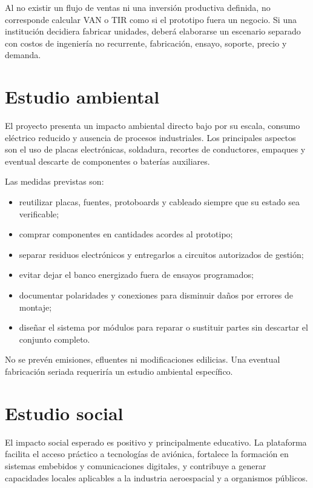 \documentclass[12pt,a4paper,oneside]{article}
\begin{document}
Al no existir un flujo de ventas ni una inversión productiva definida, no corresponde calcular VAN o TIR como si el prototipo fuera un negocio. Si una institución decidiera fabricar unidades, deberá elaborarse un escenario separado con costos de ingeniería no recurrente, fabricación, ensayo, soporte, precio y demanda.

\section{Estudio ambiental}

El proyecto presenta un impacto ambiental directo bajo por su escala, consumo eléctrico reducido y ausencia de procesos industriales. Los principales aspectos son el uso de placas electrónicas, soldadura, recortes de conductores, empaques y eventual descarte de componentes o baterías auxiliares.

Las medidas previstas son:

\begin{itemize}
  \item reutilizar placas, fuentes, protoboards y cableado siempre que su estado sea verificable;
  \item comprar componentes en cantidades acordes al prototipo;
  \item separar residuos electrónicos y entregarlos a circuitos autorizados de gestión;
  \item evitar dejar el banco energizado fuera de ensayos programados;
  \item documentar polaridades y conexiones para disminuir daños por errores de montaje;
  \item diseñar el sistema por módulos para reparar o sustituir partes sin descartar el conjunto completo.
\end{itemize}

No se prevén emisiones, efluentes ni modificaciones edilicias. Una eventual fabricación seriada requeriría un estudio ambiental específico.

\section{Estudio social}

El impacto social esperado es positivo y principalmente educativo. La plataforma facilita el acceso práctico a tecnologías de aviónica, fortalece la formación en sistemas embebidos y comunicaciones digitales, y contribuye a generar capacidades locales aplicables a la industria aeroespacial y a organismos públicos.
\end{document}
